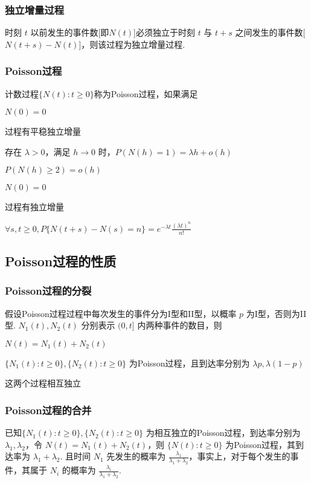 \documentclass[./main.tex]{subfiles}
\begin{document}
\subsubsection{独立增量过程}
 时刻 $t$ 以前发生的事件数[即$N(t)$]必须独立于时刻 $t$ 与 $t+s$ 之间发生的事件数[$N(t+s)-N(t)$]，则该过程为独立增量过程. 
\subsubsection{Poisson过程}
计数过程$\{N(t):t\ge 0\}$称为Poisson过程，如果满足
\begin{enumerate*}
    \item $N(0)=0$
    \item 过程有平稳独立增量
    \item 存在 $\lambda>0$，满足 $h\rightarrow 0$ 时，$P(N(h)=1)=\lambda h+o(h)$
    \item $P(N(h)\ge 2)=o(h)$
\end{enumerate*}
\begin{enumerate*}
    \item $N(0)=0$
    \item 过程有独立增量
    \item $\forall s,t\ge 0,P\{N(t+s)-N(s)=n\}=e^{-\lambda t}\frac{(\lambda t)^n}{n!}$
\end{enumerate*}
\subsection{Poisson过程的性质}
\subsubsection{Poisson过程的分裂}
假设Poisson过程过程中每次发生的事件分为I型和II型，以概率 $p$ 为I型，否则为II型. $N_1(t),N_2(t)$ 分别表示 $(0,t]$ 内两种事件的数目，则
\begin{enumerate*}
    \item $N(t)=N_1(t)+N_2(t)$
    \item $\{N_1(t):t\ge 0\},\{N_2(t):t\ge 0\}$ 为Poisson过程，且到达率分别为 $\lambda p,\lambda(1-p)$
    \item 这两个过程相互独立
\end{enumerate*}
\subsubsection{Poisson过程的合并}
已知$\{N_1(t):t\ge 0\},\{N_2(t):t\ge 0\}$ 为相互独立的Poisson过程，到达率分别为 $\lambda_1,\lambda_2$，令 $N(t)=N_1(t)+N_2(t)$，则 $\{N(t):t\ge 0\}$ 为Poisson过程，其到达率为 $\lambda_1+\lambda_2$. 且时间 $N_1$ 先发生的概率为 $\frac{\lambda_1}{\lambda_1+\lambda_2}$，事实上，对于每个发生的事件，其属于 $N_i$ 的概率为 $\frac{\lambda_i}{\lambda_1+\lambda_2}$. 
\end{document}
